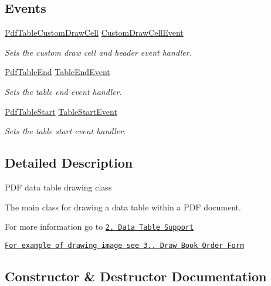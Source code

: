 \subsection*{Events}
\begin{DoxyCompactItemize}
\item 
\hyperlink{namespace_pdf_file_writer_a86406086785ea2ff62fdff82e3cd0d85}{Pdf\+Table\+Custom\+Draw\+Cell} \hyperlink{class_pdf_file_writer_1_1_pdf_table_a7a2051f74af56a391ed906abbac27899}{Custom\+Draw\+Cell\+Event}
\begin{DoxyCompactList}\small\item\em Sets the custom draw cell and header event handler. \end{DoxyCompactList}\item 
\hyperlink{namespace_pdf_file_writer_a17b93cf2af3fc48d06acff205f00cfac}{Pdf\+Table\+End} \hyperlink{class_pdf_file_writer_1_1_pdf_table_a4d018de1d01794181a6cdd138c9c89cf}{Table\+End\+Event}
\begin{DoxyCompactList}\small\item\em Sets the table end event handler. \end{DoxyCompactList}\item 
\hyperlink{namespace_pdf_file_writer_a043ecee26978d61494df91c2572eb1eb}{Pdf\+Table\+Start} \hyperlink{class_pdf_file_writer_1_1_pdf_table_a2b57e4a00adfd202b410c182fb7fd3a5}{Table\+Start\+Event}
\begin{DoxyCompactList}\small\item\em Sets the table start event handler. \end{DoxyCompactList}\end{DoxyCompactItemize}


\subsection{Detailed Description}
P\+DF data table drawing class 

The main class for drawing a data table within a P\+DF document. 

For more information go to \href{http://www.codeproject.com/Articles/570682/PDF-File-Writer-Csharp-Class-Library-Version#DataTableSupport}{\tt 2. Data Table Support} 

\href{http://www.codeproject.com/Articles/570682/PDF-File-Writer-Csharp-Class-Library-Version#DrawDataTable}{\tt For example of drawing image see 3.. Draw Book Order Form} 

\subsection{Constructor \& Destructor Documentation}

